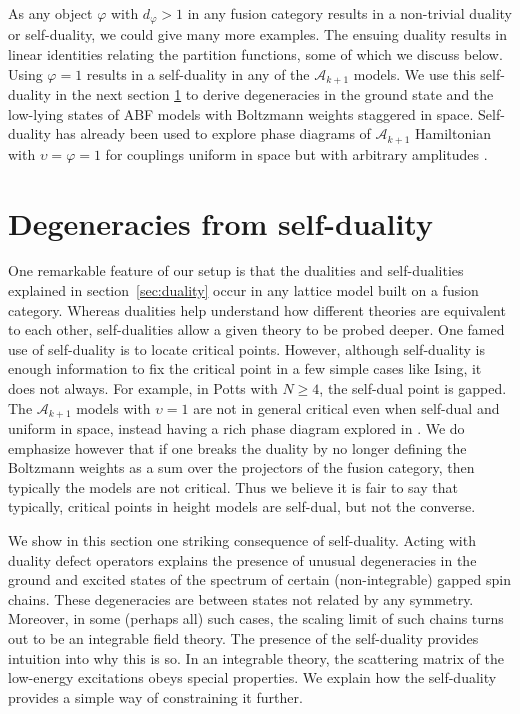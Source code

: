 As any object $\varphi$ with $d_\varphi>1$ in any fusion category results in a non-trivial duality or self-duality, we could give many more examples. The ensuing duality results in linear identities relating the partition functions, some of which we discuss below. Using $\varphi=1$ results in a self-duality in any of the $\mathcal{A}_{k+1}$ models. We use this self-duality in the next section \ref{sec:selfduality} to derive degeneracies in the ground state and the low-lying states of ABF models with Boltzmann weights staggered in space.  Self-duality has already been used to explore phase diagrams of $\mathcal{A}_{k+1}$ Hamiltonian with $\upsilon=\varphi=1$ for couplings uniform in space but with arbitrary amplitudes \cite{Trebst2008,Gils2013}.







\section{Degeneracies from self-duality}
\label{sec:selfduality}



One remarkable feature of our setup is that the dualities and self-dualities explained in section~\ref{sec:duality} occur in any lattice model built on a fusion category.
Whereas dualities help understand how different theories are equivalent to each other, self-dualities allow a given theory to be probed deeper.
One famed use of self-duality is to locate critical points.
However, although self-duality is enough information to fix the critical point in a few simple cases like Ising, it does not always.
For example, in Potts with $N\ge 4$, the self-dual point is gapped.
The $\mathcal{A}_{k+1}$ models with $\upsilon=1$ are not in general critical even when self-dual and uniform in space, instead having a rich phase diagram explored in \cite{Trebst2008,Gils2013,Vernier2017}.
We do emphasize however that if one breaks the duality by no longer defining the Boltzmann weights as a sum over the projectors of the fusion category, then typically the models are not critical.
Thus we believe it is fair to say that typically, critical points in height models are self-dual, but not the converse.


We show in this section one striking consequence of self-duality. Acting with duality defect operators explains the presence of unusual degeneracies in the ground and excited states of the spectrum of certain (non-integrable) gapped spin chains. These degeneracies are between states not related by any symmetry. Moreover, in some (perhaps all) such cases, the scaling limit of such chains turns out to be an integrable field theory. The presence of the self-duality provides intuition into why this is so. In an integrable theory, the scattering matrix of the low-energy excitations obeys special properties. We explain how the self-duality provides a simple way of constraining it further.

